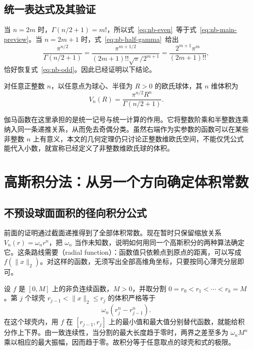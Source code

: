 \documentclass[UTF8]{ctexart}
\begin{document}
\subsection{统一表达式及其验证}

当 $n=2m$ 时，$\Gamma(n/2+1)=m!$，所以式~\eqref{eq:nb-even}~等于式~\eqref{eq:nb-main-preview}。当 $n=2m+1$ 时，式~\eqref{eq:nb-half-gamma}~给出
\[
  \frac{\pi^{n/2}}{\Gamma(n/2+1)}
  =\frac{\pi^{m+1/2}}{(2m+1)!!\sqrt\pi/2^{m+1}}
  =\frac{2^{m+1}\pi^m}{(2m+1)!!},
\]
恰好恢复式~\eqref{eq:nb-odd}。因此已经证明以下结论。

\begin{theorem}[$n$ 维欧氏球体的体积]\label{thm:nb-volume}
对任意正整数 $n$，以任意点为球心、半径为 $R>0$ 的欧氏球体，其 $n$ 维体积为
\begin{equation}\label{eq:nb-volume}
  \boxed{V_n(R)=\frac{\pi^{n/2}R^n}{\Gamma(n/2+1)}}.
\end{equation}
\end{theorem}

伽马函数在这里承担的是统一记号与统一计算的作用。它将整数阶乘和半整数连乘纳入同一条递推关系，从而免去奇偶分类。虽然右端作为实参数的函数可以在某些非整数 $n$ 上有意义，本文的几何定理仍只讨论正整数维欧氏空间，不能仅凭公式能代入小数，就宣称已经定义了非整数维欧氏球的体积。

\section{高斯积分法：从另一个方向确定体积常数}
\label{sec:nb-gaussian-method}

\subsection{不预设球面面积的径向积分公式}

前面的证明通过截面递推得到了全部体积常数。现在暂时只保留缩放关系 $V_n(r)=\omega_n r^n$，把 $\omega_n$ 当作未知数，说明如何用同一个高斯积分的两种算法确定它。这条路线需要（radial function）：函数值只依赖点到原点的距离，可以写成 $f(\|x\|_2)$。对这样的函数，无须写出全部高维角坐标，只要按同心薄壳分层即可。

设 $f$ 是 $[0,M]$ 上的非负连续函数，$M>0$，并取分割 $0=r_0<r_1<\cdots<r_k=M$。第 $j$ 个球壳 $r_{j-1}<\|x\|_2\leq r_j$ 的体积严格等于
\[
  \omega_n(r_j^n-r_{j-1}^n).
\]
在这个球壳内，用 $f$ 在 $[r_{j-1},r_j]$ 上的最小值和最大值分别替代函数，就能给积分作上下界。由一致连续性，当分割的最大长度趋于零时，两界之差至多为 $\omega_nM^n$ 乘以相应的最大振幅，因而趋于零。故积分等于任意取点的球壳和式的极限。
\end{document}
